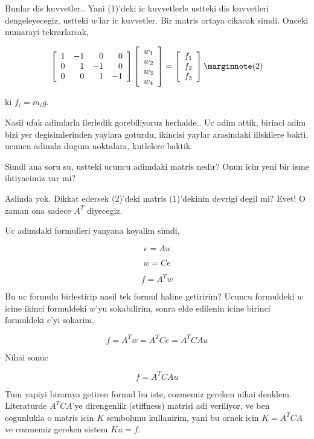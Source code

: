 \documentclass[12pt,fleqn]{article}\usepackage{../../common}
\begin{document}
Bunlar dis kuvvetler.. Yani (1)'deki ic kuvvetlerle ustteki dis kuvvetleri
dengeleyecegiz, ustteki $w$'lar ic kuvvetler. Bir matris ortaya cikacak simdi.
Onceki numarayi tekrarlarsak,

$$
\left[\begin{array}{rrrr}
1 & -1 & 0 & 0 \\ 0 & 1 & -1 & 0 \\ 0 & 0 & 1 & -1 
\end{array}\right]
\left[\begin{array}{c}
w_1 \\ w_2 \\ w_3 \\ w_4
\end{array}\right] =
\left[\begin{array}{c}
f_1 \\ f_2 \\ f_3
\end{array}\right]
\mlabel{2}
$$

ki $f_i = m_i g$. 

Nasil ufak adimlarla ilerledik gorebiliyoruz herhalde.. Uc adim attik, birinci
adim bizi yer degisimlerinden yaylara goturdu, ikincisi yaylar arasindaki
iliskilere bakti, ucuncu adimda dugum noktalara, kutlelere baktik.

Simdi ana soru su, ustteki ucuncu adimdaki matris nedir? Onun icin yeni bir isme
ihtiyacimiz var mi?

Aslinda yok. Dikkat edersek (2)'deki matris (1)'dekinin devrigi degil mi? Evet!
O zaman ona sadece $A^T$ diyecegiz.

Uc adimdaki formulleri yanyana koyalim simdi,

$$
e = Au
$$

$$
w = Ce
$$

$$
f = A^T w
$$


Bu uc formulu birlestirip nasil tek formul haline getiririm? Ucuncu formuldeki
$w$ icine ikinci formuldeki $w$'yu sokabilirim, sonra elde edilenin icine
birinci formuldeki $e$'yi sokarim,

$$
f = A^T w = A^T C e = A^T C A u
$$

Nihai sonuc

$$
f = A^T C A u
$$

Tum yapiyi biraraya getiren formul bu iste, cozmemiz gereken nihai denklem.
Literaturde $A^T C A$'ye direngenlik (stiffness) matrisi adi veriliyor, ve ben
cogunlukla o matris icin $K$ sembolunu kullanirim, yani bu ornek icin
$K = A^T C A$ ve cozmemiz gereken sistem $K u = f$.
\end{document}
